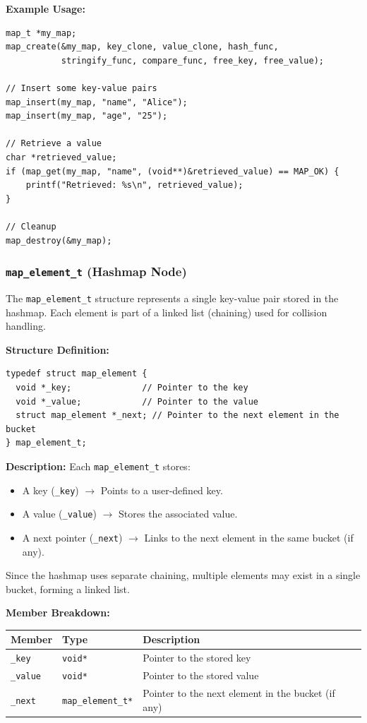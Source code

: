 \documentclass[titlepage]{article}
\begin{document}
\textbf{Example Usage:}
\begin{verbatim}
map_t *my_map;
map_create(&my_map, key_clone, value_clone, hash_func,
           stringify_func, compare_func, free_key, free_value);

// Insert some key-value pairs
map_insert(my_map, "name", "Alice");
map_insert(my_map, "age", "25");

// Retrieve a value
char *retrieved_value;
if (map_get(my_map, "name", (void**)&retrieved_value) == MAP_OK) {
    printf("Retrieved: %s\n", retrieved_value);
}

// Cleanup
map_destroy(&my_map);
\end{verbatim}

\subsubsection{\texttt{map\_element\_t} (Hashmap Node)}
The \texttt{map\_element\_t} structure represents a single key-value pair stored in the hashmap.
Each element is part of a linked list (chaining) used for collision handling.

\textbf{Structure Definition:}
\begin{verbatim}
typedef struct map_element {
  void *_key;              // Pointer to the key
  void *_value;            // Pointer to the value
  struct map_element *_next; // Pointer to the next element in the bucket
} map_element_t;
\end{verbatim}

\textbf{Description:}
Each \texttt{map\_element\_t} stores:
\begin{itemize}
    \item A key (\texttt{\_key}) $\rightarrow$ Points to a user-defined key.
    \item A value (\texttt{\_value}) $\rightarrow$ Stores the associated value.
    \item A next pointer (\texttt{\_next}) $\rightarrow$ Links to the next element in the same bucket (if any).
\end{itemize}
Since the hashmap uses separate chaining, multiple elements may exist in a single bucket, forming a linked list.

\textbf{Member Breakdown:}
\begin{center}
\begin{tabular}{@{} l l l @{} }
\toprule
\textbf{Member} & \textbf{Type} & \textbf{Description} \\
\midrule
\texttt{\_key} & \texttt{void*} & Pointer to the stored key \\
\texttt{\_value} & \texttt{void*} & Pointer to the stored value \\
\texttt{\_next} & \texttt{map\_element\_t*} & Pointer to the next element in the bucket (if any) \\
\bottomrule
\end{tabular}
\end{center}
\end{document}
